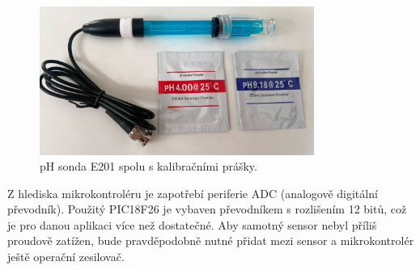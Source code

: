 \begin{figure}[h!]
    \centering
    \includegraphics[width=0.8\textwidth]{obrazky/foto/ph_sonda.jpeg}
    \caption{pH sonda E201 spolu s kalibračními prášky.}
    \label{fig:obrazky-foto-ph_sonda-jpeg}
\end{figure}

Z hlediska mikrokontroléru je zapotřebí periferie ADC (analogově digitální převodník). Použitý PIC18F26 je vybaven převodníkem s rozlišením  12 bitů, což je pro danou aplikaci více než dostatečné. Aby samotný sensor nebyl příliš proudově zatížen, bude pravděpodobně nutné přidat mezi sensor a mikrokontrolér ještě operační zesilovač. 




